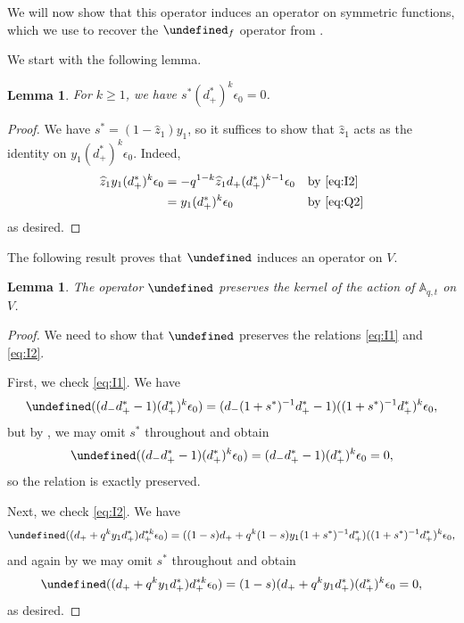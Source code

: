 \documentclass[reqno]{amsart}
\theoremstyle{plain}
\newtheorem{lemma}[theorem]{Lemma}
\theoremstyle{definition}
\theoremstyle{remark}
\newcommand{\A}{\mathbb{A}}%
\newcommand{\z}{\widehat{z}}
\let\oldTheta\Theta
\let\Theta\undefined
\DeclareMathOperator{\Theta}{\oldTheta}
\newcommand{\<}{\langle}
\renewcommand{\>}{\rangle}
\begin{document}
We will now show that this operator induces an operator on symmetric functions, which we use to recover the $\Theta_f$ operator from \cite[Equation~(28)]{DAdderioIraciVandenWyngaerd2021ThetaOperators}.

We start with the following lemma.

\begin{lemma}
    \label{lem:s*_acts_as_0}
    For $k \geq 1$, we have $s^* (d_+^*)^k \epsilon_0 = 0$.
\end{lemma}

\begin{proof}
    We have $s^* = (1 - \z_1) y_1$, so it suffices to show that $\z_1$ acts as the identity on $y_1 (d_+^*)^k \epsilon_0$. Indeed,
    \begin{align*}
        \z_1 y_1 (d_+^*)^k \epsilon_0
        & = -q^{1-k} \z_1 d_+ (d_+^*)^{k-1} \epsilon_0 && \text{by \eqref{eq:I2}} \\
        & = y_1 (d_+^*)^k \epsilon_0 && \text{by \eqref{eq:Q2}} \\
    \end{align*}
    as desired.
\end{proof}

The following result proves that $\Theta$ induces an operator on $V$.

\begin{lemma}
    \label{lem:preserve_kernel}
    The operator $\Theta$ preserves the kernel of the action of $\A_{q,t}$ on $V$.
\end{lemma}

\begin{proof}
    We need to show that $\Theta$ preserves the relations \eqref{eq:I1} and \eqref{eq:I2}.

    First, we check \eqref{eq:I1}. We have
    \[ \Theta((d_- d_+^* - 1) (d_+^*)^k \epsilon_0) = (d_- (1+s^*)^{-1} d_+^* - 1) ((1+s^*)^{-1} d_+^*)^k \epsilon_0, \]
    but by , we may omit $s^*$ throughout and obtain
    \[ \Theta((d_- d_+^* - 1) (d_+^*)^k \epsilon_0) = (d_- d_+^* - 1) (d_+^*)^k \epsilon_0 = 0, \]
    so the relation is exactly preserved.
    
    Next, we check \eqref{eq:I2}. We have
    \[ \Theta((d_+ + q^k y_1 d_+^*) d_+^{*k} \epsilon_0) = ((1-s)d_+ + q^k (1-s) y_1 (1+s^*)^{-1} d_+^*) ((1+s^*)^{-1} d_+^*)^k \epsilon_0, \]
    and again by  we may omit $s^*$ throughout and obtain
    \[ \Theta((d_+ + q^k y_1 d_+^*) d_+^{*k} \epsilon_0) = (1-s) (d_+ + q^k y_1 d_+^*) (d_+^*)^k \epsilon_0 = 0, \]
    as desired.
\end{proof}
\end{document}
